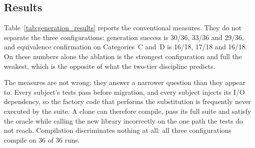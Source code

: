 \subsection{Results}

Table~\ref{tab:generation_results} reports the conventional measures. They do not separate the three configurations: generation success is 30/36, 33/36 and 29/36, and equivalence confirmation on Categories~C and~D is 16/18, 17/18 and 16/18. On these numbers alone the ablation is the strongest configuration and full \sys the weakest, which is the opposite of what the two-tier discipline predicts.

The measures are not wrong; they answer a narrower question than they appear to. Every subject's tests pass before migration, and every subject injects its I/O dependency, so the factory code that performs the substitution is frequently never executed by the suite. A clone can therefore compile, pass its full suite and satisfy the oracle while calling the new library incorrectly on the one path the tests do not reach. Compilation discriminates nothing at all: all three configurations compile on 36 of 36 runs.

\begin{table}[t]
\centering
{}
\caption{Clone-generation results on the industrial measurement and control corpus. Twelve programs $\times$ three seeds $=$ 36 runs per configuration; equivalence confirmation is over Categories~C and~D only (18 runs per configuration). Repair iterations are \emph{VCA}-triggered stage re-entries, summed over all runs. \emph{Takeaway:} the conventional measures do not distinguish the three configurations---the ablation scores highest on two of them---which motivates the independent review reported in Table~\ref{tab:judge}.}
\label{tab:generation_results}
\end{table}

